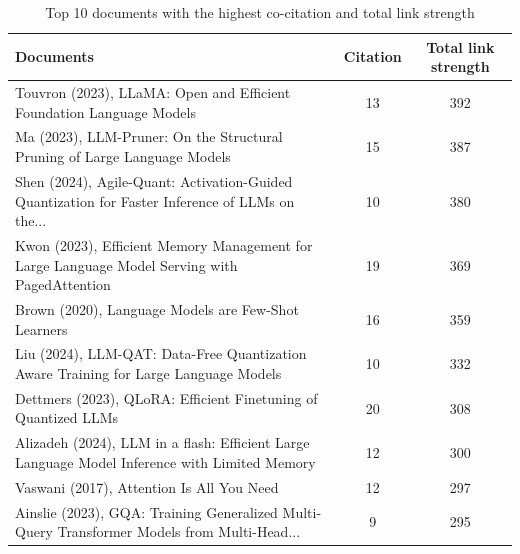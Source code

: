 \begin{table}[htbp]
\centering
\small
\caption{Top 10 documents with the highest co-citation and total link strength}
\label{tab:D}
\begin{tabularx}{\textwidth}{Ycc}
\hline
\textbf{Documents} & \textbf{Citation} & \textbf{Total link strength} \\ \hline
Touvron (2023), LLaMA: Open and Efficient Foundation Language Models & 13 & 392 \\
Ma (2023), LLM-Pruner: On the Structural Pruning of Large Language Models & 15 & 387 \\
Shen (2024), Agile-Quant: Activation-Guided Quantization for Faster Inference of LLMs on the... & 10 & 380 \\
Kwon (2023), Efficient Memory Management for Large Language Model Serving with PagedAttention & 19 & 369 \\
Brown (2020), Language Models are Few-Shot Learners & 16 & 359 \\
Liu (2024), LLM-QAT: Data-Free Quantization Aware Training for Large Language Models & 10 & 332 \\
Dettmers (2023), QLoRA: Efficient Finetuning of Quantized LLMs & 20 & 308 \\
Alizadeh (2024), LLM in a flash: Efficient Large Language Model Inference with Limited Memory & 12 & 300 \\
Vaswani (2017), Attention Is All You Need & 12 & 297 \\
Ainslie (2023), GQA: Training Generalized Multi-Query Transformer Models from Multi-Head... & 9 & 295 \\ \hline
\end{tabularx}
\par\vspace{2pt}{\normalsize Source: Author interpretation based on VOSviewer analysis.}
\end{table}
